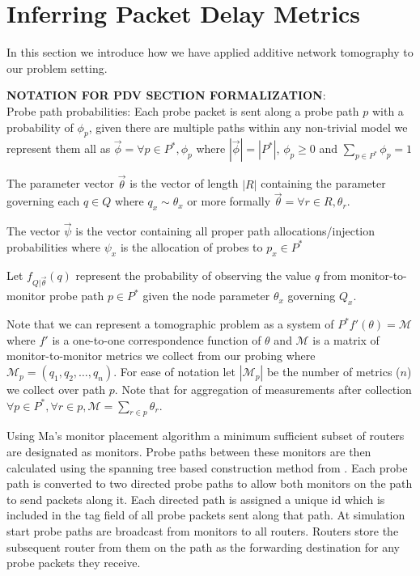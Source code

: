 \section{Inferring Packet Delay Metrics}
\label{sec:Mnetworkprobing}
In this section we introduce how we have applied additive network tomography to our problem setting.
\begin{mdframed}
\textbf{NOTATION FOR PDV SECTION FORMALIZATION}:\\
Probe path probabilities: Each probe packet is sent along a probe path $p$ with a probability of $\phi_p$, given there are multiple paths within any non-trivial model we represent them all as $\vec{\phi}=\forall p\in P^*, \phi_p$ where $|\vec{\phi}|=|P^*|$, $\phi_p \geq 0$ and $\sum_{p\in P^*}\phi_p = 1$

The parameter vector $\vec{\theta}$ is the vector of length $|R|$ containing the parameter governing each $q\in Q$ where $ q_x \sim \theta_x$ or more formally $\vec{\theta}=\forall r\in R, \theta_r$.

The vector $\vec{\psi}$ is the vector containing all proper path allocations/injection probabilities where $\psi_x$ is the allocation of probes to $p_x\in P^*$ 

Let $f_{Q|\vec{\theta}}(q)$ represent the probability of observing the value $q$ from monitor-to-monitor probe path $p\in P^*$ given the node parameter $\theta_x$ governing $Q_x$.

Note that we can represent a tomographic problem as a system of $P^*f'(\theta)=\mathcal{M}$ where $f'$ is a one-to-one correspondence function of $\theta$ and $\mathcal{M}$ is a matrix of monitor-to-monitor metrics we collect from our probing where $\mathcal{M}_p = (q_1,q_2,\ldots, q_n)$. For ease of notation let $|\mathcal{M}_p|$ be the number of metrics ($n$) we collect over path $p$. Note that for aggregation of measurements after collection $\forall p\in P^*, \forall r\in p, \mathcal{M}=\sum_{r\in p}\theta_r$.
\end{mdframed}
Using Ma's monitor placement algorithm a minimum sufficient subset of routers are designated as monitors. Probe paths between these monitors are then calculated using the spanning tree based construction method from \cite{he_network_2021}. Each probe path is converted to two directed probe paths to allow both monitors on the path to send packets along it. Each directed path is assigned a unique id which is included in the tag field of all probe packets sent along that path. At simulation start probe paths are broadcast from monitors to all routers. Routers store the subsequent router from them on the path as the forwarding destination for any probe packets they receive.\par
